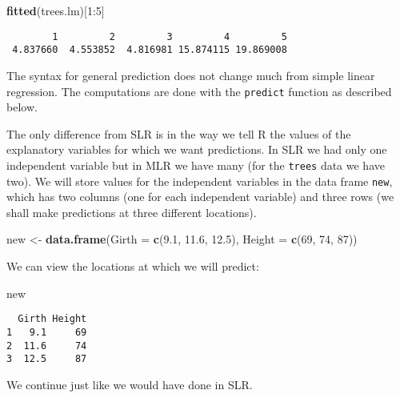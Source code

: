 \documentclass[]{book}
\newenvironment{Shaded}{\begin{snugshade}}{\end{snugshade}}
\newcommand{\KeywordTok}[1]{\textcolor[rgb]{0.13,0.29,0.53}{\textbf{{#1}}}}
\newcommand{\DataTypeTok}[1]{\textcolor[rgb]{0.13,0.29,0.53}{{#1}}}
\newcommand{\DecValTok}[1]{\textcolor[rgb]{0.00,0.00,0.81}{{#1}}}
\newcommand{\FloatTok}[1]{\textcolor[rgb]{0.00,0.00,0.81}{{#1}}}
\newcommand{\StringTok}[1]{\textcolor[rgb]{0.31,0.60,0.02}{{#1}}}
\newcommand{\NormalTok}[1]{{#1}}
\numberwithin{equation}{chapter}
\numberwithin{figure}{chapter}
\theoremstyle{plain}
\theoremstyle{definition}
\theoremstyle{remark}
\theoremstyle{definition}
\theoremstyle{definition}
\theoremstyle{remark}
\begin{document}
\begin{Shaded}
\begin{Highlighting}[]
\KeywordTok{fitted}\NormalTok{(trees.lm)[}\DecValTok{1}\NormalTok{:}\DecValTok{5}\NormalTok{]}
\end{Highlighting}
\end{Shaded}

\begin{verbatim}
        1         2         3         4         5 
 4.837660  4.553852  4.816981 15.874115 19.869008 
\end{verbatim}

The syntax for general prediction does not change much from simple
linear regression. The computations are done with the \texttt{predict}
function as described below.

The only difference from SLR is in the way we tell R the values of the
explanatory variables for which we want predictions. In SLR we had only
one independent variable but in MLR we have many (for the \texttt{trees}
data we have two). We will store values for the independent variables in
the data frame \texttt{new}, which has two columns (one for each
independent variable) and three rows (we shall make predictions at three
different locations).

\begin{Shaded}
\begin{Highlighting}[]
\NormalTok{new <-}\StringTok{ }\KeywordTok{data.frame}\NormalTok{(}\DataTypeTok{Girth =} \KeywordTok{c}\NormalTok{(}\FloatTok{9.1}\NormalTok{, }\FloatTok{11.6}\NormalTok{, }\FloatTok{12.5}\NormalTok{), }\DataTypeTok{Height =} \KeywordTok{c}\NormalTok{(}\DecValTok{69}\NormalTok{, }\DecValTok{74}\NormalTok{, }\DecValTok{87}\NormalTok{))}
\end{Highlighting}
\end{Shaded}

We can view the locations at which we will predict:

\begin{Shaded}
\begin{Highlighting}[]
\NormalTok{new}
\end{Highlighting}
\end{Shaded}

\begin{verbatim}
  Girth Height
1   9.1     69
2  11.6     74
3  12.5     87
\end{verbatim}

We continue just like we would have done in SLR.
\end{document}
